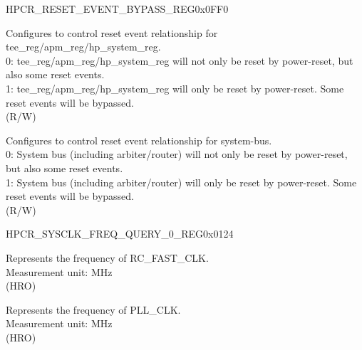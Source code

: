 \begin{register}{H}{PCR\_RESET\_EVENT\_BYPASS\_REG}{0x0FF0}\label{regdesc:PCRRESETEVENTBYPASSREG}
%
%
%
\regnewline%
\begin{regdesc}\begin{reglist}
\label{fielddesc:PCRRESETEVENTBYPASSAPM}\item [PCR\_RESET\_EVENT\_BYPASS\_APM] Configures to control reset event relationship for tee\_reg/apm\_reg/hp\_system\_reg. \\
0: tee\_reg/apm\_reg/hp\_system\_reg will not only be reset by power-reset, but also some reset events.\\
1: tee\_reg/apm\_reg/hp\_system\_reg will only be reset by power-reset. Some reset events will be bypassed.\\ 
(R/W)
\label{fielddesc:PCRRESETEVENTBYPASS}\item [PCR\_RESET\_EVENT\_BYPASS] Configures to control reset event relationship for system-bus. \\
0: System bus (including arbiter/router) will not only be reset by power-reset, but also some reset events.\\
1: System bus (including arbiter/router) will only be reset by power-reset. Some reset events will be bypassed.\\ 
(R/W)
\end{reglist}\end{regdesc}
\end{register}


\begin{register}{H}{PCR\_SYSCLK\_FREQ\_QUERY\_0\_REG}{0x0124}\label{regdesc:PCRSYSCLKFREQQUERY0REG}
%
%
%
\regnewline%
\begin{regdesc}\begin{reglist}
\label{fielddesc:PCRFOSCFREQ}\item [PCR\_FOSC\_FREQ] Represents the frequency of RC\_FAST\_CLK.\\
Measurement unit: MHz\\ (HRO)
\label{fielddesc:PCRPLLFREQ}\item [PCR\_PLL\_FREQ] Represents the frequency of PLL\_CLK.\\
Measurement unit: MHz\\
(HRO)
\end{reglist}\end{regdesc}
\end{register}


